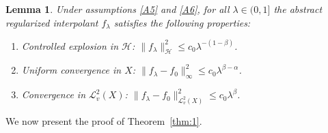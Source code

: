 \documentclass[11pt]{article}
\newtheorem{lemma}{Lemma}
\theoremstyle{definition}
\theoremstyle{remark}
\begin{document}
\begin{lemma}
\label{lem:intprop}
Under assumptions \ref{A5} and \ref{A6}, for all $\lambda \in (0,1]$ the abstract regularized interpolant $f_{\lambda}$ satisfies the following properties:
\begin{enumerate}
\item  Controlled explosion in $\mathcal{H}$: $\|f_{\lambda}\|_{\mathcal{H}}^2 \leq c_0 \lambda^{-(1-\beta)}$.
\item Uniform convergence in $X$: $\|f_{\lambda}-f_0\|_{\infty}^2 \leq c_0 \lambda^{\beta-\alpha}$. 
\item Convergence in $\mathcal{L}^2_v(X)$: $\|f_{\lambda}-f_0\|_{\mathcal{L}^2_{v}(X)}^2 \leq c_0 \lambda^{\beta}$.
\end{enumerate}
\end{lemma}

We now present the proof of Theorem~\ref{thm:1}.
\end{document}
